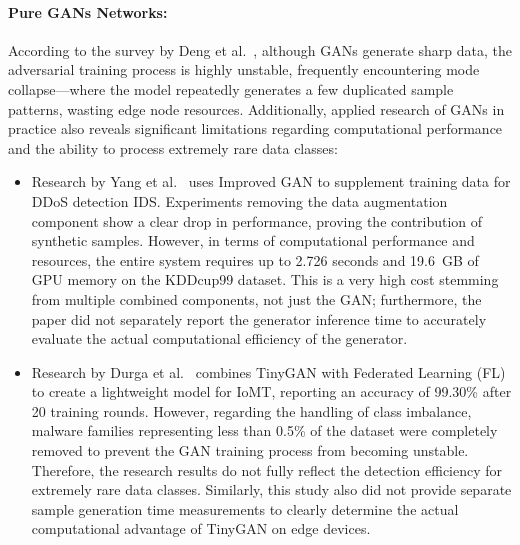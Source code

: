\paragraph{Pure GANs Networks:}
According to the survey by Deng et al.~\cite{deng2025}, although GANs generate sharp data, the adversarial training process is highly unstable, frequently encountering mode collapse---where the model repeatedly generates a few duplicated sample patterns, wasting edge node resources. Additionally, applied research of GANs in practice also reveals significant limitations regarding computational performance and the ability to process extremely rare data classes:
\begin{itemize}
    \item Research by Yang et al.~\cite{yang2025} uses Improved GAN to supplement training data for DDoS detection IDS. Experiments removing the data augmentation component show a clear drop in performance, proving the contribution of synthetic samples. However, in terms of computational performance and resources, the entire system requires up to 2.726 seconds and 19.6~GB of GPU memory on the KDDcup99 dataset. This is a very high cost stemming from multiple combined components, not just the GAN; furthermore, the paper did not separately report the generator inference time to accurately evaluate the actual computational efficiency of the generator.
    \item Research by Durga et al.~\cite{durga2026} combines TinyGAN with Federated Learning (FL) to create a lightweight model for IoMT, reporting an accuracy of 99.30\% after 20 training rounds. However, regarding the handling of class imbalance, malware families representing less than 0.5\% of the dataset were completely removed to prevent the GAN training process from becoming unstable. Therefore, the research results do not fully reflect the detection efficiency for extremely rare data classes. Similarly, this study also did not provide separate sample generation time measurements to clearly determine the actual computational advantage of TinyGAN on edge devices.
\end{itemize}

